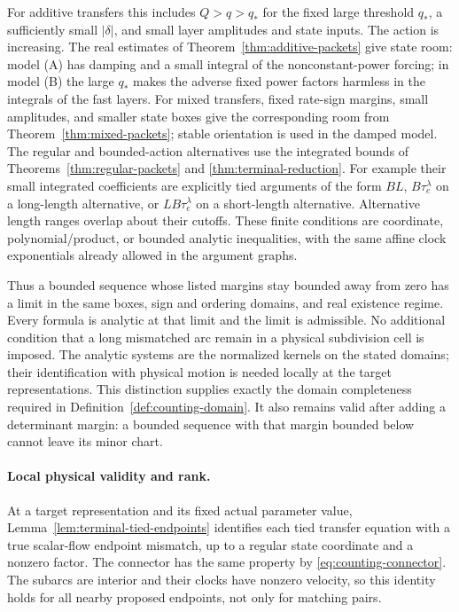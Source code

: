 For additive transfers this includes $Q>q>q_*$ for the fixed large
threshold $q_*$, a sufficiently small $|\delta|$, and small layer
amplitudes and state inputs.  The action is increasing.  The real
estimates of Theorem~\ref{thm:additive-packets} give state room:
model (A) has damping and a small integral of the nonconstant-power
forcing; in model (B) the large $q_*$ makes the adverse fixed power
factors harmless in the integrals of the fast layers.  For mixed
transfers, fixed rate-sign margins, small amplitudes, and smaller
state boxes give the corresponding room from
Theorem~\ref{thm:mixed-packets}; stable orientation is used in the
damped model.  The regular and bounded-action alternatives use the
integrated bounds of Theorems~\ref{thm:regular-packets} and
\ref{thm:terminal-reduction}.  For example their small integrated
coefficients are explicitly tied arguments of the form $BL$,
$B\tau_e^\lambda$ on a long-length alternative, or
$LB\tau_e^\lambda$ on a short-length alternative.  Alternative
length ranges overlap about their cutoffs.  These finite conditions
are coordinate, polynomial/product, or bounded analytic inequalities,
with the same affine clock exponentials already allowed in the
argument graphs.

Thus a bounded sequence whose listed margins stay bounded away from
zero has a limit in the same boxes, sign and ordering domains, and
real existence regime.  Every formula is analytic at that limit and
the limit is admissible.  No additional condition that a long
mismatched arc remain in a physical subdivision cell is imposed.
The analytic systems are the normalized kernels on the stated
domains; their identification with physical motion is needed locally
at the target representations.  This distinction supplies exactly the
domain completeness required in Definition~\ref{def:counting-domain}.
It also remains valid after adding a determinant margin: a bounded
sequence with that margin bounded below cannot leave its minor
chart.

\paragraph{Local physical validity and rank.}
At a target representation and its fixed actual parameter value,
Lemma~\ref{lem:terminal-tied-endpoints} identifies each tied transfer
equation with a true scalar-flow endpoint mismatch, up to a regular
state coordinate and a nonzero factor.  The connector has the same
property by \eqref{eq:counting-connector}.  The subarcs are interior
and their clocks have nonzero velocity, so this identity holds for
all nearby proposed endpoints, not only for matching pairs.

